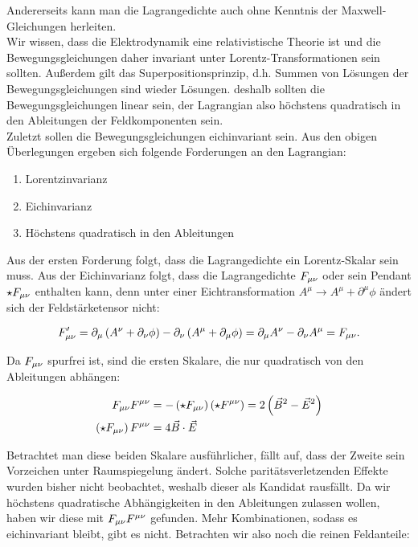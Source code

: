 Andererseits kann man die Lagrangedichte auch ohne Kenntnis der Maxwell-Gleichungen herleiten. \\
Wir wissen, dass die Elektrodynamik eine relativistische Theorie ist und die Bewegungsgleichungen daher invariant unter Lorentz-Transformationen sein sollten. Außerdem gilt das Superpositionsprinzip, d.h. Summen von Lösungen der Bewegungsgleichungen sind wieder Lösungen. deshalb sollten die Bewegungsgleichungen linear sein, der Lagrangian also höchstens quadratisch in den Ableitungen der Feldkomponenten sein. \\ 
Zuletzt sollen die Bewegungsgleichungen eichinvariant sein.
Aus den obigen Überlegungen ergeben sich folgende Forderungen an den Lagrangian: \\
\begin{enumerate}
	\item Lorentzinvarianz
	\item Eichinvarianz 
	\item  Höchstens quadratisch in den Ableitungen
\end{enumerate}

Aus der ersten Forderung folgt, dass die Lagrangedichte ein Lorentz-Skalar sein muss. Aus der Eichinvarianz folgt, dass die Lagrangedichte $F_{\mu \nu}$ oder sein Pendant $\star F_{\mu \nu}$ enthalten kann, denn unter einer Eichtransformation $A^{\mu} \rightarrow A^{\mu} + \partial^{\mu} \phi$ ändert sich der Feldstärketensor nicht:

\begin{align}
F_{\mu \nu} ' = \partial_{\mu} \left( A^{\nu} + \partial_{\nu} \phi \right) - \partial_{\nu} \left( A^{\mu} + \partial_{\mu} \phi \right) = \partial_{\mu}  A^{\nu} - \partial_{\nu} A^{\mu} = F_{\mu \nu}.
\end{align}

Da $F_{\mu \nu}$ spurfrei ist, sind die ersten Skalare, die nur quadratisch von den Ableitungen abhängen:

\begin{align}
F_{\mu \nu} F^{\mu \nu} &= - \left( \star F_{\mu \nu} \right) \left( \star F^{\mu \nu} \right) = 2 \left( \vec{B}^2 - \vec{E}^2 \right) \\
\left( \star F_{\mu \nu} \right) F^{\mu \nu} &= 4 \vec{B} \cdot \vec{E}
\end{align}

Betrachtet man diese beiden Skalare ausführlicher, fällt auf, dass der Zweite sein Vorzeichen unter Raumspiegelung ändert. Solche paritätsverletzenden Effekte wurden bisher nicht beobachtet, weshalb dieser als Kandidat rausfällt. Da wir höchstens quadratische Abhängigkeiten in den Ableitungen zulassen wollen, haben wir diese mit $F_{\mu \nu} F^{\mu \nu}$ gefunden. Mehr Kombinationen, sodass es eichinvariant bleibt, gibt es nicht. Betrachten wir also noch die reinen Feldanteile: \\

